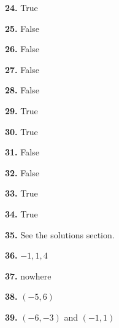 \documentclass[12pt,]{book}
\theoremstyle{plain}
\theoremstyle{definition}
\numberwithin{equation}{section}
\newcommand{\ointerval}[2]{\left(#1,#2\right)}
\begin{document}
                \par\smallskip
\noindent\textbf{24.}\quad{}
                    True%
 
                \par\smallskip
\noindent\textbf{25.}\quad{}
                    False%
 
                \par\smallskip
\noindent\textbf{26.}\quad{}
                    False%
 
                \par\smallskip
\noindent\textbf{27.}\quad{}
                    False%

                \par\smallskip
\noindent\textbf{28.}\quad{}
                    False%

                \par\smallskip
\noindent\textbf{29.}\quad{}
                    True%

                \par\smallskip
\noindent\textbf{30.}\quad{}
                    True%

                \par\smallskip
\noindent\textbf{31.}\quad{}
                    False%

                \par\smallskip
\noindent\textbf{32.}\quad{}
                    False%

                \par\smallskip
\noindent\textbf{33.}\quad{}
                    True%

                \par\smallskip
\noindent\textbf{34.}\quad{}
                    True%

                \par\smallskip
\noindent\textbf{35.}\quad{}
                See the solutions section.%

            \par\smallskip
\noindent\textbf{36.}\quad{}
                    \(-1,1,4\)%

                \par\smallskip
\noindent\textbf{37.}\quad{}
                    nowhere%

                \par\smallskip
\noindent\textbf{38.}\quad{}
                    \(\ointerval{-5}{6}\)%

                \par\smallskip
\noindent\textbf{39.}\quad{}
                    \(\ointerval{-6}{-3}\) and \(\ointerval{-1}{1}\)%
\end{document}
